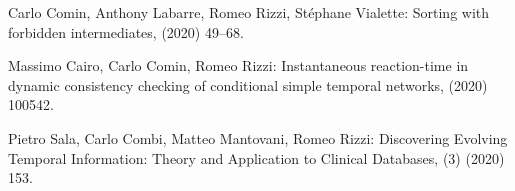 \begin{etaremune}
  \item {\sc Carlo Comin, Anthony Labarre, Romeo Rizzi, Stéphane Vialette:}
   \newblock Sorting with forbidden intermediates,
    (2020) 49--68.

  \item {\sc Massimo Cairo, Carlo Comin, Romeo Rizzi:}
   \newblock Instantaneous reaction-time in dynamic consistency checking of conditional simple temporal networks,
    (2020) 100542.

  \item {\sc Pietro Sala, Carlo Combi, Matteo Mantovani, Romeo Rizzi:}
   \newblock Discovering Evolving Temporal Information: Theory and Application to Clinical Databases,
   (3) (2020) 153.

\end{etaremune}

